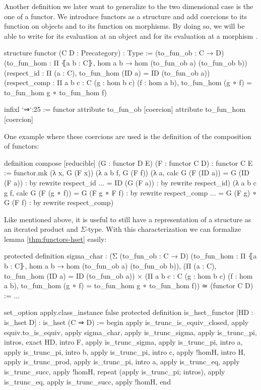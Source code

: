 Another definition we later want to generalize to the two dimensional case is the one
of a functor.
We introduce functors as a structure and add coercions to its function on objects
and to its function on morphisms.
By doing so, we will be able to write  for its evaluation at an object
 and  for its evaluation at a morphism .
\begin{leancode}
structure functor (C D : Precategory) : Type :=
  (to_fun_ob : C → D)
  (to_fun_hom : Π ⦃a b : C⦄, hom a b → hom (to_fun_ob a) (to_fun_ob b))
  (respect_id : Π (a : C), to_fun_hom (ID a) = ID (to_fun_ob a))
  (respect_comp : Π {a b c : C} (g : hom b c) (f : hom a b),
    to_fun_hom (g ∘ f) = to_fun_hom g ∘ to_fun_hom f)

infixl `⇒`:25 := functor
attribute to_fun_ob [coercion]
attribute to_fun_hom [coercion]
\end{leancode}

One example where these coercions are used is the definition of the composition
of functors:
\begin{leancode}
definition compose [reducible] (G : functor D E) (F : functor C D) :
  functor C E :=
functor.mk
  (λ x, G (F x))
  (λ a b f, G (F f))
  (λ a, calc
    G (F (ID a)) = G (ID (F a)) : by rewrite respect_id
             ... = ID (G (F a)) : by rewrite respect_id)
  (λ a b c g f, calc
    G (F (g ∘ f)) = G (F g ∘ F f)     : by rewrite respect_comp
              ... = G (F g) ∘ G (F f) : by rewrite respect_comp)
\end{leancode}

Like mentioned above, it is useful to still have a representation of a structure
as an iterated product and $\Sigma$-type.
With this characterization we can formalize lemma \ref{thm:functors-hset} easily:
\begin{leancode}
protected definition sigma_char :
  (Σ (to_fun_ob : C → D)
  (to_fun_hom : Π ⦃a b : C⦄, hom a b → hom (to_fun_ob a) (to_fun_ob b)),
  (Π (a : C), to_fun_hom (ID a) = ID (to_fun_ob a)) ×
  (Π {a b c : C} (g : hom b c) (f : hom a b),
    to_fun_hom (g ∘ f) = to_fun_hom g ∘ to_fun_hom f)) ≃ (functor C D) :=
...

set_option apply.class_instance false
protected definition is_hset_functor [HD : is_hset D] : is_hset (C ⇒ D) :=
begin
  apply is_trunc_is_equiv_closed, apply equiv.to_is_equiv,
    apply sigma_char,
  apply is_trunc_sigma, apply is_trunc_pi, intros, exact HD, intro F,
  apply is_trunc_sigma, apply is_trunc_pi, intro a,
    {apply is_trunc_pi, intro b,
     apply is_trunc_pi, intro c, apply !homH},
  intro H, apply is_trunc_prod,
    {apply is_trunc_pi, intro a,
     apply is_trunc_eq, apply is_trunc_succ, apply !homH},
    {repeat (apply is_trunc_pi; intros),
     apply is_trunc_eq, apply is_trunc_succ, apply !homH},
end
\end{leancode}

